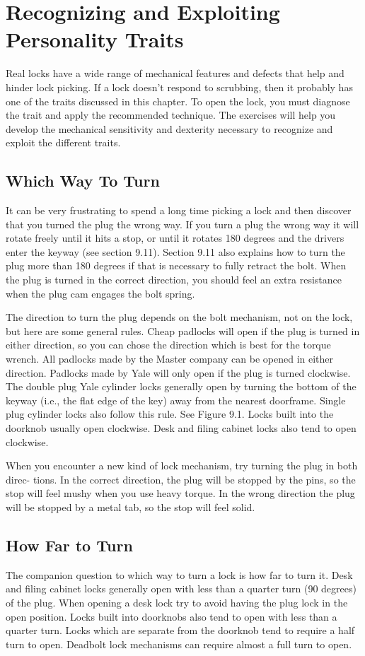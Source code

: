 \chapter{Recognizing and Exploiting Personality Traits}
Real locks have a wide range of mechanical features and defects that help and hinder lock 
picking. If a lock doesn't respond to scrubbing, then it probably has one of the traits 
discussed in this chapter. To open the lock, you must diagnose the trait and apply the 
recommended technique. The exercises will help you develop the mechanical sensitivity and 
dexterity necessary to recognize and exploit the different traits.

\section{Which Way To Turn}
It can be very frustrating to spend a long time picking a lock and then discover that you 
turned the plug the wrong way. If you turn a plug the wrong way it will rotate freely until it 
hits a stop, or until it rotates 180 degrees and the drivers enter the keyway (see section 9.11). 
Section 9.11 also explains how to turn the plug more than 180 degrees if that is necessary 
to fully retract the bolt. When the plug is turned in the correct direction, you should feel 
an extra resistance when the plug cam engages the bolt spring. 

The direction to turn the plug depends on the bolt mechanism, not on the lock, but here 
are some general rules. Cheap padlocks will open if the plug is turned in either direction, so 
you can chose the direction which is best for the torque wrench. All padlocks made by the 
Master company can be opened in either direction. Padlocks made by Yale will only open if 
the plug is turned clockwise. The double plug Yale cylinder locks generally open by turning 
the bottom of the keyway (i.e., the flat edge of the key) away from the nearest doorframe. 
Single plug cylinder locks also follow this rule. See Figure 9.1. Locks built into the doorknob 
usually open clockwise. Desk and filing cabinet locks also tend to open clockwise. 

When you encounter a new kind of lock mechanism, try turning the plug in both direc- 
tions. In the correct direction, the plug will be stopped by the pins, so the stop will feel 
mushy when you use heavy torque. In the wrong direction the plug will be stopped by a 
metal tab, so the stop will feel solid. 

\section{How Far to Turn}
The companion question to which way to turn a lock is how far to turn it. Desk and filing 
cabinet locks generally open with less than a quarter turn (90 degrees) of the plug. When 
opening a desk lock try to avoid having the plug lock in the open position. Locks built into 
doorknobs also tend to open with less than a quarter turn. Locks which are separate from 
the doorknob tend to require a half turn to open. Deadbolt lock mechanisms can require 
almost a full turn to open. 

